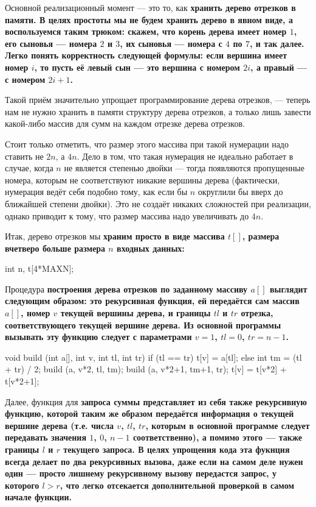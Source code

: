 Основной реализационный момент --- это то, как \bf{хранить} дерево отрезков в памяти. В целях простоты мы не будем хранить дерево в явном виде, а воспользуемся таким трюком: скажем, что корень дерева имеет номер $1$, его сыновья --- номера $2$ и $3$, их сыновья --- номера с $4$ по $7$, и так далее. Легко понять корректность следующей формулы: если вершина имеет номер $i$, то пусть её левый сын --- это вершина с номером $2i$, а правый --- с номером $2i+1$.

Такой приём значительно упрощает программирование дерева отрезков, --- теперь нам не нужно хранить в памяти структуру дерева отрезков, а только лишь завести какой-либо массив для сумм на каждом отрезке дерева отрезков.

Стоит только отметить, что размер этого массива при такой нумерации надо ставить не $2n$, а $4n$. Дело в том, что такая нумерация не идеально работает в случае, когда $n$ не является степенью двойки --- тогда появляются пропущенные номера, которым не соответствуют никакие вершины дерева (фактически, нумерация ведёт себя подобно тому, как если бы $n$ округлили бы вверх до ближайшей степени двойки). Это не создаёт никаких сложностей при реализации, однако приводит к тому, что размер массива надо увеличивать до $4n$.

Итак, дерево отрезков мы \bf{храним} просто в виде массива $t[]$, размера вчетверо больше размера $n$ входных данных:

\code
int n, t[4*MAXN];
\endcode

Процедура \bf{построения дерева отрезков} по заданному массиву $a[]$ выглядит следующим образом: это рекурсивная функция, ей передаётся сам массив $a[]$, номер $v$ текущей вершины дерева, и границы $tl$ и $tr$ отрезка, соответствующего текущей вершине дерева. Из основной программы вызывать эту функцию следует с параметрами $v=1$, $tl=0$, $tr=n-1$.

\code
void build (int a[], int v, int tl, int tr) {
	if (tl == tr)
		t[v] = a[tl];
	else {
		int tm = (tl + tr) / 2;
		build (a, v*2, tl, tm);
		build (a, v*2+1, tm+1, tr);
		t[v] = t[v*2] + t[v*2+1];
	}
}
\endcode

Далее, функция для \bf{запроса суммы} представляет из себя также рекурсивную функцию, которой таким же образом передаётся информация о текущей вершине дерева (т.е. числа $v$, $tl$, $tr$, которым в основной программе следует передавать значения $1$, $0$, $n-1$ соответственно), а помимо этого --- также границы $l$ и $r$ текущего запроса. В целях упрощения кода эта фукнция всегда делает по два рекурсивных вызова, даже если на самом деле нужен один --- просто лишнему рекурсивному вызову передастся запрос, у которого $l > r$, что легко отсекается дополнительной проверкой в самом начале функции.

